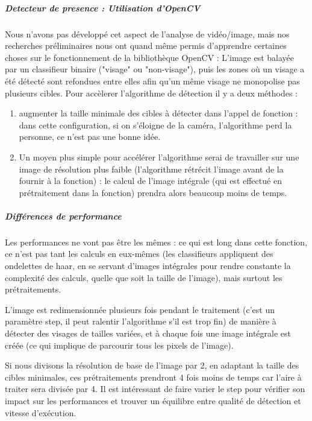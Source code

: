 			\subparagraph{Detecteur de presence : Utilisation d'OpenCV}
				Nous n'avons pas développé cet aspect de l'analyse de vidéo/image, mais nos recherches préliminaires nous ont quand même permis d'apprendre certaines choses sur le fonctionnement de la bibliothèque OpenCV : L'image est balayée par un classifieur binaire ("visage" ou "non-visage"), puis les zones où un visage a été détecté sont refondues entre elles afin qu'un même visage ne monopolise pas plusieurs cibles. 
				Pour accèlerer l'algorithme de détection il y a deux méthodes :
				\begin{enumerate}
					\item augmenter la taille minimale des cibles à détecter dans l'appel de fonction : dans cette configuration, si on s'éloigne de la caméra, l'algorithme perd la personne, ce n'est pas une bonne idée.
					\item Un moyen plus simple pour accélérer l'algorithme serai de travailler sur une image de résolution plus faible (l'algorithme rétrécit l'image avant de la fournir à la fonction) : le calcul de l'image intégrale (qui est effectué en prétraitement dans la fonction) prendra alors beaucoup moins de temps.
				\end{enumerate}
		
			\subparagraph{Différences de performance}
				Les performances ne vont pas être les mêmes : ce qui est long dans cette fonction, ce n'est pas tant les calculs en eux-mêmes (les classifieurs appliquent des ondelettes de haar, en se servant d'images intégrales pour rendre constante la complexité des calculs, quelle que soit la taille de l'image), mais surtout les prétraitements.
			
			L'image est redimensionnée plusieurs fois pendant le traitement (c'est un paramètre step, il peut ralentir l'algorithme s'il est trop fin) de manière à détecter des visages de tailles variées, et à chaque fois une image intégrale est créée (ce qui implique de parcourir tous les pixels de l'image).
			
			Si nous divisons la résolution de base de l'image  par 2, en adaptant la taille des cibles minimales, ces prétraitements prendront 4 fois moins de temps car l'aire à traiter sera divisée par 4. Il est intéressant de faire varier le step pour vérifier son impact sur les performances et trouver un équilibre entre qualité de détection et vitesse d'exécution.
			
